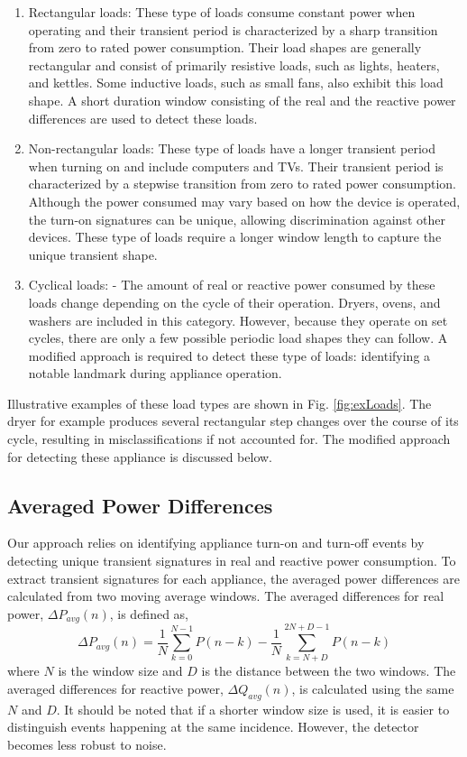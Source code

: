 \documentclass[conference]{IEEEtran}
\begin{document}
\begin{enumerate}
\item{Rectangular loads:} These type of loads consume constant power when operating and their transient period is characterized by a sharp transition from zero to rated power consumption.  Their load shapes are generally rectangular and consist of primarily resistive loads, such as lights, heaters, and kettles.  Some inductive loads, such as small fans, also exhibit this load shape.  A short duration window consisting of the real and the reactive power differences are used to detect these loads.
\newline
\item{Non-rectangular loads:} These type of loads have a longer transient period when turning on and include computers and TVs.  Their transient period is characterized by a stepwise transition from zero to rated power consumption.  Although the power consumed may vary based on how the device is operated, the turn-on signatures can be unique, allowing discrimination against other devices.  These type of loads require a longer window length to capture the unique transient shape.
\newline
\item{Cyclical loads:} - The amount of real or reactive power consumed by these loads change depending on the cycle of their operation.  Dryers, ovens, and washers are included in this category.   However, because they operate on set cycles, there are only a few possible periodic load shapes they can follow.  A modified approach is required to detect these type of loads: identifying a notable landmark during appliance operation.
\end{enumerate}

Illustrative examples of these load types are shown in Fig. \ref{fig:exLoads}.  The dryer for example produces several rectangular step changes over the course of its cycle, resulting in misclassifications if not accounted for.  The modified approach for detecting these appliance is discussed below.

\subsection{Averaged Power Differences}
Our approach relies on identifying appliance turn-on and turn-off events by detecting unique transient signatures in real and reactive power consumption. To extract transient signatures for each appliance, the averaged power differences are calculated from two moving average windows.  The averaged differences for real power, $\Delta P_{avg}(n)$, is defined as,
\begin{equation}
\Delta P_{avg}(n) = \frac{1}{N}\sum_{k=0}^{N-1}P(n-k) - \frac{1}{N}\sum_{k=N+D}^{2N+D-1}P(n-k)
\end{equation}
where $N$ is the window size and $D$ is the distance between the two windows.  The averaged differences for reactive power, $\Delta Q_{avg}(n)$, is calculated using the same $N$ and $D$.  It should be noted that if a shorter window size is used, it is easier to distinguish events happening at the same incidence.  However, the detector becomes less robust to noise.
\end{document}

